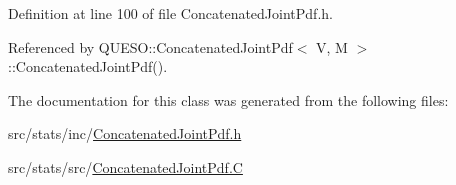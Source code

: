 Definition at line 100 of file Concatenated\-Joint\-Pdf.\-h.



Referenced by Q\-U\-E\-S\-O\-::\-Concatenated\-Joint\-Pdf$<$ V, M $>$\-::\-Concatenated\-Joint\-Pdf().



The documentation for this class was generated from the following files\-:\begin{DoxyCompactItemize}
\item 
src/stats/inc/\hyperlink{_concatenated_joint_pdf_8h}{Concatenated\-Joint\-Pdf.\-h}\item 
src/stats/src/\hyperlink{_concatenated_joint_pdf_8_c}{Concatenated\-Joint\-Pdf.\-C}\end{DoxyCompactItemize}
